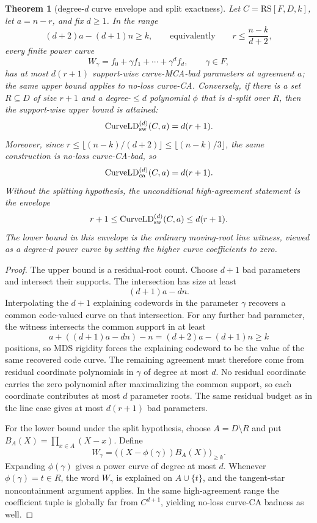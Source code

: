 \documentclass[11pt]{article}
\newtheorem{theorem}{Theorem}[section]
\theoremstyle{definition}
\newcommand{\RS}{\mathrm{RS}}
\begin{document}
\begin{theorem}[degree-\(d\) curve envelope and split exactness]\label{thm:B-curve-envelope}
Let \(C=\RS[F,D,k]\), let \(a=n-r\), and fix \(d\ge1\).  In the range
\[
        (d+2)a-(d+1)n\ge k,
        \qquad\text{equivalently}\qquad
        r\le \frac{n-k}{d+2},
\]
every finite power curve
\[
        W_\gamma=f_0+\gamma f_1+\cdots+\gamma^d f_d,
        \qquad \gamma\in F,
\]
has at most \(d(r+1)\) support-wise curve-MCA-bad parameters at agreement
\(a\); the same upper bound applies to no-loss curve-CA.  Conversely, if there
is a set \(R\subseteq D\) of size \(r+1\) and a degree-\(\le d\) polynomial
\(\phi\) that is \(d\)-split over \(R\), then the support-wise upper bound is attained:
\[
        \operatorname{CurveLD}^{(d)}_{\rm sw}(C,a)=d(r+1).
\]
Moreover, since \(r\le \lfloor(n-k)/(d+2)\rfloor\le \lfloor(n-k)/3\rfloor\), the same construction is no-loss curve-CA-bad, so
\[
        \operatorname{CurveLD}^{(d)}_{\rm ca}(C,a)=d(r+1).
\]
Without the splitting hypothesis, the unconditional high-agreement statement is
the envelope
\[
        r+1\le \operatorname{CurveLD}^{(d)}_{\rm sw}(C,a)\le d(r+1).
\]
The lower bound in this envelope is the ordinary moving-root line witness,
viewed as a degree-\(d\) power curve by setting the higher curve coefficients to
zero.
\end{theorem}

\begin{proof}
The upper bound is a residual-root count.  Choose \(d+1\) bad parameters and
intersect their supports.  The intersection has size at least
\[
        (d+1)a-dn.
\]
Interpolating the \(d+1\) explaining codewords in the parameter \(\gamma\)
recovers a common code-valued curve on that intersection.  For any further bad
parameter, the witness intersects the common support in at least
\[
        a+((d+1)a-dn)-n=(d+2)a-(d+1)n\ge k
\]
positions, so MDS rigidity forces the explaining codeword to be the value of the
same recovered code curve.  The remaining agreement must therefore come from
residual coordinate polynomials in \(\gamma\) of degree at most \(d\).  No
residual coordinate carries the zero polynomial after maximalizing the common
support, so each coordinate contributes at most \(d\) parameter roots.  The same
residual budget as in the line case gives at most \(d(r+1)\) bad parameters.

For the lower bound under the split hypothesis, choose
\(A=D\setminus R\) and put \(B_A(X)=\prod_{x\in A}(X-x)\).  Define
\[
        W_\gamma=\bigl((X-\phi(\gamma))B_A(X)\bigr)_{\ge k}.
\]
Expanding \(\phi(\gamma)\) gives a power curve of degree at most \(d\).  Whenever
\(\phi(\gamma)=t\in R\), the word \(W_\gamma\) is explained on
\(A\cup\{t\}\), and the tangent-star noncontainment argument applies.  In the
same high-agreement range the coefficient tuple is globally far from
\(C^{d+1}\), yielding no-loss curve-CA badness as well.
\end{proof}
\end{document}

